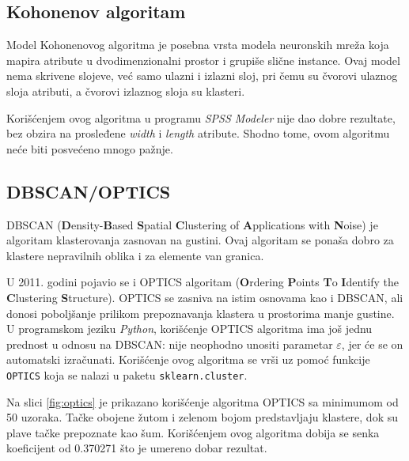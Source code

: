 \documentclass[a4paper]{article}
\begin{document}
\subsection{Kohonenov algoritam}
\label{subsec:kohonen}

Model Kohonenovog algoritma je posebna vrsta modela neuronskih mreža koja mapira atribute u dvodimenzionalni prostor i grupiše slične instance. Ovaj model nema skrivene slojeve, već samo ulazni i izlazni sloj, pri čemu su čvorovi ulaznog sloja atributi, a čvorovi izlaznog sloja su klasteri.

Korišćenjem ovog algoritma u programu \textit{SPSS Modeler} nije dao dobre rezultate, bez obzira na prosleđene \textit{width} i \textit{length} atribute. Shodno tome, ovom algoritmu neće biti posvećeno mnogo pažnje.

\subsection{DBSCAN/OPTICS}
\label{subsec:dbscan}

DBSCAN (\textbf{D}ensity-\textbf{B}ased \textbf{S}patial \textbf{C}lustering of \textbf{A}pplications with \textbf{N}oise) je algoritam klasterovanja zasnovan na gustini. Ovaj algoritam se ponaša dobro za klastere nepravilnih oblika i za elemente van granica. 

U 2011. godini pojavio se i OPTICS algoritam\cite{optics} (\textbf{O}rdering \textbf{P}oints \textbf{T}o \textbf{I}dentify the \textbf{C}lustering \textbf{S}tructure). OPTICS se zasniva na istim osnovama kao i DBSCAN, ali donosi poboljšanje prilikom prepoznavanja klastera u prostorima manje gustine. U programskom jeziku \textit{Python}, korišćenje OPTICS algoritma ima još jednu prednost u odnosu na DBSCAN: nije neophodno unositi parametar $ \varepsilon $, jer će se on automatski izračunati. Korišćenje ovog algoritma se vrši uz pomoć funkcije \texttt{OPTICS} koja se nalazi u paketu \texttt{sklearn.cluster}.

Na slici \ref{fig:optics} je prikazano korišćenje algoritma OPTICS sa minimumom od 50 uzoraka. Tačke obojene žutom i zelenom bojom predstavljaju klastere, dok su plave tačke prepoznate kao šum. Korišćenjem ovog algoritma dobija se senka koeficijent od 0.370271 što je umereno dobar rezultat.
\end{document}
